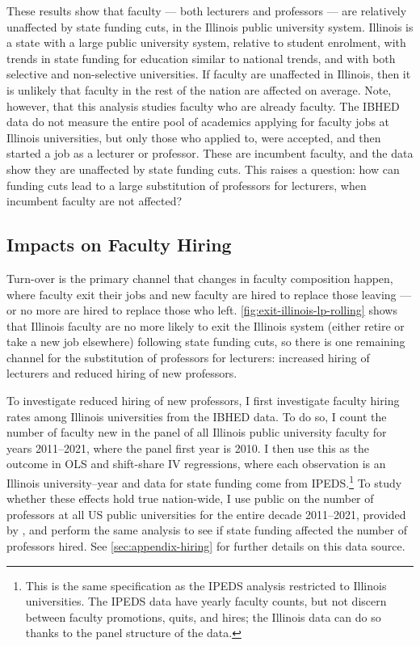 These results show that faculty --- both lecturers and professors --- are relatively unaffected by state funding cuts, in the Illinois public university system.
Illinois is a state with a large public university system, relative to student enrolment, with trends in state funding for education similar to national trends, and with both selective and non-selective universities.
If faculty are unaffected in Illinois, then it is unlikely that faculty in the rest of the nation are affected on average.
Note, however, that this analysis studies faculty who are already faculty.
The IBHED data do not measure the entire pool of academics applying for faculty jobs at Illinois universities, but only those who applied to, were accepted, and then started a job as a lecturer or professor.
These are incumbent faculty, and the data show they are unaffected by state funding cuts.
This raises a question: how can funding cuts lead to a large substitution of professors for lecturers, when incumbent faculty are not affected?

\subsection{Impacts on Faculty Hiring}
Turn-over is the primary channel that changes in faculty composition happen, where faculty exit their jobs and new faculty are hired to replace those leaving --- or no more are hired to replace those who left.
\autoref{fig:exit-illinois-lp-rolling} shows that Illinois faculty are no more likely to exit the Illinois system (either retire or take a new job elsewhere) following state funding cuts, so there is one remaining channel for the substitution of professors for lecturers: increased hiring of lecturers and reduced hiring of new professors.

To investigate reduced hiring of new professors, I first investigate faculty hiring rates among Illinois universities from the IBHED data.
To do so, I count the number of faculty new in the panel of all Illinois public university faculty for years 2011--2021, where the panel first year is 2010.
I then use this as the outcome in OLS and shift-share IV regressions, where each observation is an Illinois university--year and data for state funding come from IPEDS.\footnote{
    This is the same specification as the IPEDS analysis restricted to Illinois universities.
    The IPEDS data have yearly faculty counts, but not discern between faculty promotions, quits, and hires; the Illinois data can do so thanks to the panel structure of the data.
}
To study whether these effects hold true nation-wide, I use public on the number of professors at all US public universities for the entire decade 2011--2021, provided by \citep{wapman2022quantifying},
and perform the same analysis to see if state funding affected the number of professors hired.
See \autoref{sec:appendix-hiring} for further details on this data source.

